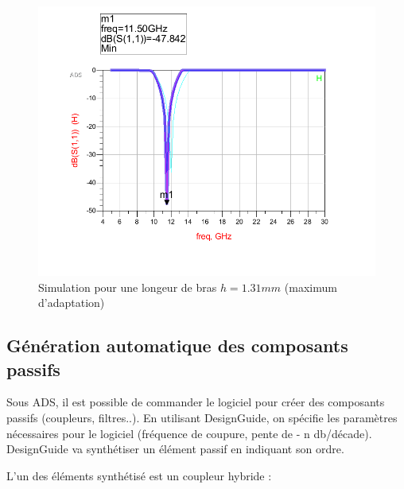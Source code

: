 \documentclass[a4paper]{article}
\begin{document}
\begin{figure}[!htb]
\begin{center}
  \includegraphics[scale=0.45]{adaptation_height_1-31mm.png}
  \caption{Simulation pour une longeur de bras $h = 1.31 mm$ (maximum d'adaptation)}
  \label{adaptation_height_1-31mm}
\end{center}
\end{figure}

\clearpage
\subsection{G\'en\'eration automatique des composants passifs}
Sous ADS, il est possible de commander le logiciel pour cr\'eer des composants passifs (coupleurs, filtres..).
En utilisant DesignGuide, on sp\'ecifie les param\`etres n\'ecessaires pour le logiciel (fr\'equence de coupure,
pente de - n db/d\'ecade). DesignGuide va synth\'etiser un \'el\'ement passif en indiquant son ordre.

L'un des \'el\'ements synth\'etis\'e est un coupleur hybride :
\end{document}
